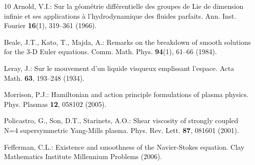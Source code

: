 \documentclass[11pt,a4paper]{article}
\begin{document}
\begin{thebibliography}{10}
Arnold, V.I.: Sur la géométrie différentielle des groupes de Lie de dimension infinie et ses applications à l'hydrodynamique des fluides parfaits. Ann. Inst. Fourier \textbf{16}(1), 319--361 (1966).

Beale, J.T., Kato, T., Majda, A.: Remarks on the breakdown of smooth solutions for the 3-D Euler equations. Comm. Math. Phys. \textbf{94}(1), 61--66 (1984).

Leray, J.: Sur le mouvement d'un liquide visqueux emplissant l'espace. Acta Math. \textbf{63}, 193--248 (1934).

Morrison, P.J.: Hamiltonian and action principle formulations of plasma physics. Phys. Plasmas \textbf{12}, 058102 (2005).

Policastro, G., Son, D.T., Starinets, A.O.: Shear viscosity of strongly coupled N=4 supersymmetric Yang-Mills plasma. Phys. Rev. Lett. \textbf{87}, 081601 (2001).

Fefferman, C.L.: Existence and smoothness of the Navier-Stokes equation. Clay Mathematics Institute Millennium Problems (2006).
\end{thebibliography}
\end{document}
